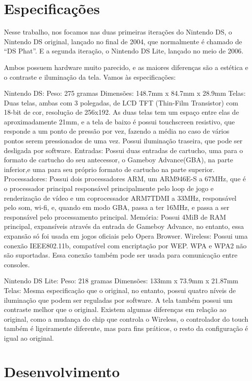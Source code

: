 \documentclass[brazil]{abnt}
\begin{document}
\section{Especificações}

Nesse trabalho, nos focamos nas duas primeiras iterações do Nintendo DS, o Nintendo DS original, lançado no final de 2004, que normalmente é chamado de ``DS Phat''. E a segunda iteração, o Nintendo DS Lite, lançado no meio de 2006.

Ambos possuem hardware muito parecido, e as maiores diferenças são a estética e o contraste e iluminação da tela. Vamos às especificações:

Nintendo DS:
Peso: 275 gramas
Dimensões: 148.7mm x 84.7mm x 28.9mm
Telas: Duas telas, ambas com 3 polegadas, de LCD TFT (Thin-Film Transistor) com 18-bit de cor, resolução de 256x192. As duas telas tem um espaço entre elas de aproximadamente 21mm, e a tela de baixo é possui touchscreen resistivo, que responde a um ponto de pressão por vez, fazendo a média no caso de vários pontos serem pressionados de uma vez.
Possui iluminação traseira, que pode ser desligada por software.
Entradas: Possui duas entradas de cartucho, uma para o formato de cartucho do seu antecessor, o Gameboy Advance(GBA), na parte inferior,e uma para seu próprio formato de cartucho na parte superior.
Processadores: Possui dois processadores ARM, um ARM946E-S a 67MHz, que é o processador principal responsável principalmente pelo loop de jogo e renderização de vídeo e um coprocessador ARM7TDMI a 33MHz, responsável pelo som, wi-fi, e, quando em modo GBA, passa a ter 16MHz, e passa a ser responsável pelo processamento principal.
Memória: Possui 4MiB de RAM principal, expansíveis através da entrada de Gameboy Advance, no entanto, essa expansão só foi usada em jogos oficiais pelo Opera Browser.
Wireless: Possui uma conexão IEEE802.11b, compatível com encriptação por WEP. WPA e WPA2 não são suportadas. Essa conexão também pode ser usada para comunicação entre consoles.

Nintendo DS Lite:
Peso: 218 gramas
Dimensões: 133mm x 73.9mm x 21.87mm
Telas: Mesma especificação que o original, no entanto, possui quatro níveis de iluminação que podem ser reguladas por software. A tela também possui um contraste melhor que o original.
Existem algumas diferenças em relação ao original, como a mudança do chip que controla o Wireless, o controlador do touch também é ligeiramente diferente, mas para fins práticos, o resto da configuração é igual ao original.

\section{Desenvolvimento}
\end{document}
